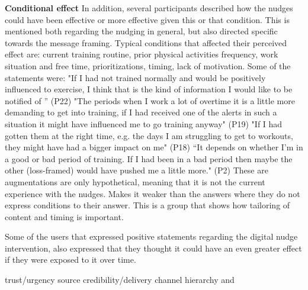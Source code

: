 \textbf{Conditional effect}
In addition, several participants described how the nudges could have been effective or more effective given this or that condition. This is mentioned both regarding the nudging in general, but also directed specific towards the message framing. Typical conditions that affected their perceived effect are: current training routine, prior physical activities frequency, work situation and free time, prioritizations, timing, lack of motivation. Some of the statements were: 
"If I had not trained normally and would be positively influenced to exercise, I think that is the kind of information I would like to be notified of ” (P22)
"The periods when I work a lot of overtime it is a little more demanding to get into training, if I had received one of the alerts in such a situation it might have influenced me to go  training anyway" (P19)
"If I had gotten them at the right time, e.g. the days I am struggling to get to workouts, they might have had a bigger impact on me" (P18)
“It depends on whether I'm in a good or bad period of training. If I had been in a bad period then maybe the other (loss-framed) would have pushed me a little more." (P2)
These are augmentations are only hypothetical, meaning that it is not the current experience with the nudges. Makes it weaker than the answers where they do not express conditions to their answer. This is a group that shows how tailoring of content and timing is important.

Some of the users that expressed positive statements regarding the digital nudge intervention, also expressed that they thought it could have an even greater effect if they were exposed to it over time.

trust/urgency source credibility/delivery channel hierarchy and 


















